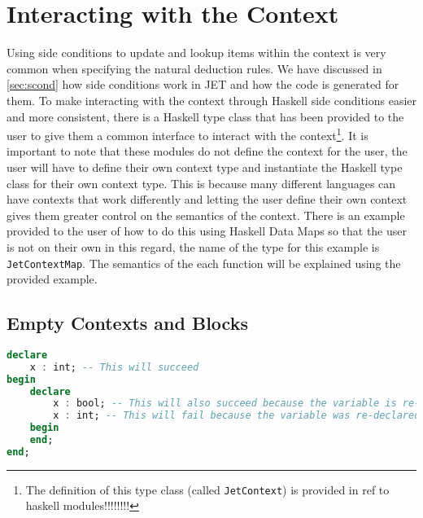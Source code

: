\section{Interacting with the Context}
\label{sec:context}
Using side conditions to update and lookup items within the context is very common when specifying the natural deduction rules.
We have discussed in \autoref{sec:scond} how side conditions work in JET and how the code is generated for them.
To make interacting with the context through Haskell side conditions easier and more consistent, there is a Haskell type class that has been provided to the user to give them a common interface to interact with the context\footnote{The definition of this type class (called \texttt{JetContext}) is provided in ref to haskell modules!!!!!!!!}.
It is important to note that these modules do not define the context for the user, the user will have to define their own context type and instantiate the Haskell type class for their own context type.
This is because many different languages can have contexts that work differently and letting the user define their own context gives them greater control on the semantics of the context.
There is an example provided to the user of how to do this using Haskell Data Maps so that the user is not on their own in this regard, the name of the type for this example is \texttt{JetContextMap}.
The semantics of the each function will be explained using the provided example.

\subsection{Empty Contexts and Blocks}
\begin{lstlisting}[language=ada, caption=Example of declarations in a block structured language such as Ad, label=lst:blockDecl]
declare
    x : int; -- This will succeed
begin
    declare
        x : bool; -- This will also succeed because the variable is re-declared in a new block
        x : int; -- This will fail because the variable was re-declared in the same block as the previous declaration
    begin
    end;
end;
\end{lstlisting}

